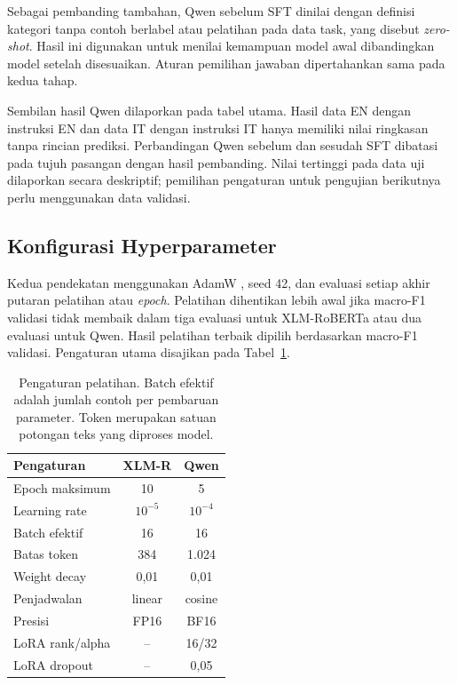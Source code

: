 \documentclass[11pt]{article}
\begin{document}
Sebagai pembanding tambahan, Qwen sebelum SFT dinilai dengan definisi kategori tanpa contoh berlabel atau pelatihan pada data task, yang disebut \textit{zero-shot}. Hasil ini digunakan untuk menilai kemampuan model awal dibandingkan model setelah disesuaikan. Aturan pemilihan jawaban dipertahankan sama pada kedua tahap.

Sembilan hasil Qwen dilaporkan pada tabel utama. Hasil data EN dengan instruksi EN dan data IT dengan instruksi IT hanya memiliki nilai ringkasan tanpa rincian prediksi. Perbandingan Qwen sebelum dan sesudah SFT dibatasi pada tujuh pasangan dengan hasil pembanding. Nilai tertinggi pada data uji dilaporkan secara deskriptif; pemilihan pengaturan untuk pengujian berikutnya perlu menggunakan data validasi.

\subsection{Konfigurasi Hyperparameter}
Kedua pendekatan menggunakan AdamW \citep{loshchilov-hutter-2019-decoupled}, seed 42, dan evaluasi setiap akhir putaran pelatihan atau \textit{epoch}. Pelatihan dihentikan lebih awal jika macro-F1 validasi tidak membaik dalam tiga evaluasi untuk XLM-RoBERTa atau dua evaluasi untuk Qwen. Hasil pelatihan terbaik dipilih berdasarkan macro-F1 validasi. Pengaturan utama disajikan pada Tabel~\ref{tab:hyper}.

\begin{table}[t]
\centering
\small
\setlength{\tabcolsep}{3pt}
\begin{tabular}{lcc}
\toprule
Pengaturan & XLM-R & Qwen \\
\midrule
Epoch maksimum & 10 & 5 \\
Learning rate & $10^{-5}$ & $10^{-4}$ \\
Batch efektif & 16 & 16 \\
Batas token & 384 & 1.024 \\
Weight decay & 0,01 & 0,01 \\
Penjadwalan & linear & cosine \\
Presisi & FP16 & BF16 \\
LoRA rank/alpha & -- & 16/32 \\
LoRA dropout & -- & 0,05 \\
\bottomrule
\end{tabular}
\caption{Pengaturan pelatihan. Batch efektif adalah jumlah contoh per pembaruan parameter. Token merupakan satuan potongan teks yang diproses model.}
\label{tab:hyper}
\end{table}
\end{document}
